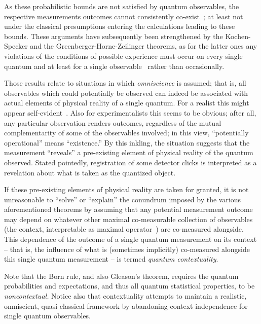 \documentclass[runningheads]{llncs}
\begin{document}
As these probabilistic bounds are not satisfied by quantum observables,
the respective measurements outcomes cannot consistently co-exist~\cite{peres222};
at least not under the classical
presumptions entering the calculations leading to these bounds.
These arguments have subsequently been strengthened by the Kochen-Specker
and the Greenberger-Horne-Zeilinger theorems, as for the latter ones
any violations of the conditions of possible experience must occur
on every single quantum and at least for a single observable~\cite{svozil_2010-pc09}
rather than occasionally.

Those results relate to situations in which {\em omniscience} is assumed; that is,
all observables which could potentially be observed can indeed
be associated with actual elements of physical reality of a single quantum.
For a realist this might appear self-evident~\cite{stace1}.
Also for experimentalists this seems to be obvious;
after all, any particular observation renders outcomes,
regardless of the mutual complementarity of some of the observables involved;
in this view, ``potentially operational'' means  ``existence.''
By this inkling, the situation suggests that the measurement ``reveals''
a pre-existing element of physical reality of the quantum observed.
Stated pointedly,
registration of some detector clicks is interpreted as a revelation
about what is taken as the quantized object.

If these pre-existing elements of physical reality are taken for granted,
it is not unreasonable to ``solve''
or ``explain'' the conundrum imposed by the various aforementioned theorems
by assuming that
any potential measurement outcome
may depend on whatever other maximal co-measurable collection of observables
(the context, interpretable as maximal operator~\cite[sect.~84]{halmos-vs})
are co-measured alongside.
This dependence of the outcome of a single quantum measurement on its context
-- that is, the influence of what is (sometimes implicitly) co-measured alongside this single quantum measurement --
is termed {\em quantum contextuality}.

Note that the Born rule, and also Gleason's theorem,
requires the quantum probabilities and expectations, and thus
all quantum statistical properties, to be {\em noncontextual.}
Notice also that
contextuality attempts to maintain a realistic, omniscient,
quasi-classical framework by abandoning context independence for single quantum observables.
\end{document}
